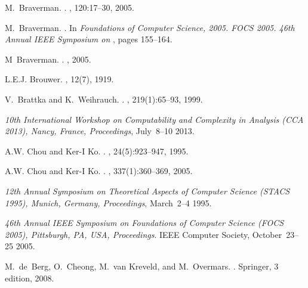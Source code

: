 \documentclass{CSML}
\begin{document}
\begin{thebibliography}{dBCvKO08}
M.~Braverman.
.
, 120:17--30,
  2005.

M.~Braverman.
.
\newblock In {\em {Foundations of Computer Science, 2005. FOCS 2005. 46th
  Annual IEEE Symposium on}\/} \cite{conf/focs/2005}, pages 155--164.

M~Braverman.
.
, 2005.

L.E.J. Brouwer.
, 12(7), 1919.

V.~Brattka and K.~Weihrauch.
.
, 219(1):65--93, 1999.

{\em {10th International Workshop on Computability and Complexity in Analysis
  (CCA 2013), Nancy, France, Proceedings}}, July~8--10 2013.

A.W. Chou and Ker-I Ko.
.
, 24(5):923--947, 1995.

A.W. Chou and Ker-I Ko.
.
, 337(1):360--369, 2005.

{\em {12th Annual Symposium on Theoretical Aspects of Computer Science (STACS
  1995), Munich, Germany, Proceedings}}, March~2--4 1995.

{\em {46th Annual IEEE Symposium on Foundations of Computer Science (FOCS
  2005), Pittsburgh, PA, USA, Proceedings}}. {IEEE Computer Society},
  October~23--25 2005.

M.~de~Berg, O.~Cheong, M.~van Kreveld, and M.~Overmars.
.
\newblock Springer, 3 edition, 2008.


\end{thebibliography}
\end{document}
